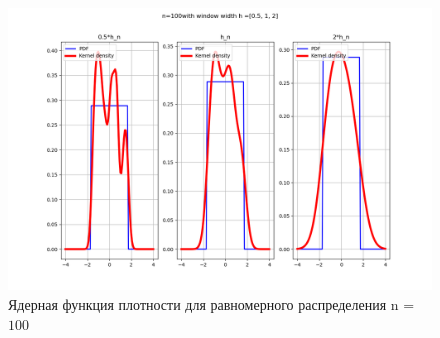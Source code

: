 \documentclass[a4]{article}
\begin{document}
\begin{center}
\begin{figure}[H]
	\caption{ Ядерная функция плотности для равномерного распределения n = $100$}
	\includegraphics[width=\textwidth]{uniform_pdf_100.png} 
\end{figure}

\end{center}
\end{document}
